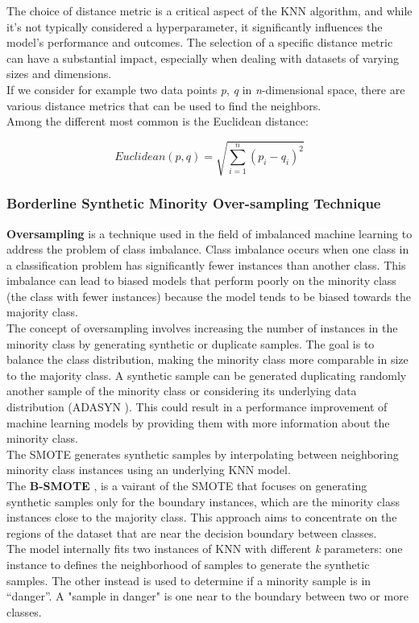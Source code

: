 The choice of distance metric is a critical aspect of the KNN algorithm, and while it's not typically considered a hyperparameter, it significantly influences the model's performance and outcomes. 
The selection of a specific distance metric can have a substantial impact, especially when dealing with datasets of varying sizes and dimensions. \\
If we consider for example two data points \textit{p}, \textit{q} in \textit{n}-dimensional space, there are various distance metrics that can be used to find the neighbors.\\
Among the different  most common is the Euclidean distance: 
\begin{center}
    \begin{equation}
        Euclidean(p,q) = \sqrt{\sum_{i=1}^{n} (p_i - q_i)^2}
        \end{equation}
\end{center}

\subsubsection{Borderline Synthetic Minority Over-sampling Technique}
\textbf{Oversampling} is a technique used in the field of imbalanced machine learning to address the problem of class imbalance. 
Class imbalance occurs when one class in a classification problem has significantly fewer instances than another class. 
This imbalance can lead to biased models that perform poorly on the minority class (the class with fewer instances) because the model tends to be biased towards the majority class.\\
The concept of oversampling involves increasing the number of instances in the minority class by generating synthetic or duplicate samples. 
The goal is to balance the class distribution, making the minority class more comparable in size to the majority class. 
A synthetic sample can be generated duplicating randomly another sample of the minority class or considering its underlying data distribution (ADASYN \cite{adasyn:2008}).
This could result in a performance improvement of machine learning models by providing them with more information about the minority class.\\
The SMOTE generates synthetic samples by interpolating between neighboring minority class instances using an underlying KNN model.\\

The \textbf{B-SMOTE} \cite{Han2005BorderlineSMOTEAN:2005}, is a vairant of the SMOTE that focuses on generating synthetic samples only for the boundary instances, which are the minority class instances close to the majority class. 
This approach aims to concentrate on the regions of the dataset that are near the decision boundary between classes. \\
The model internally fits two instances of KNN with different \textit{k} parameters: one instance to defines the neighborhood of samples to generate the synthetic samples.
The other instead is used to determine if a minority sample is in “danger”. A "sample in danger" is one near to the boundary between two or more classes.

